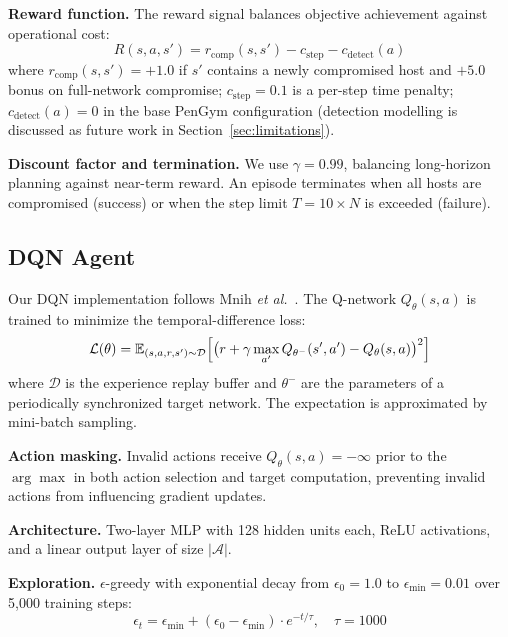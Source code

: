\documentclass[conference]{IEEEtran}
\begin{document}
\textbf{Reward function.}  The reward signal balances objective
achievement against operational cost:
\begin{equation}
  R(s, a, s') = r_{\text{comp}}(s,s') - c_{\text{step}} - c_{\text{detect}}(a)
  \label{eq:reward}
\end{equation}
where
$r_{\text{comp}}(s, s') = +1.0$ if $s'$ contains a newly compromised
host and $+5.0$ bonus on full-network compromise;
$c_{\text{step}} = 0.1$ is a per-step time penalty;
$c_{\text{detect}}(a) = 0$ in the base PenGym configuration (detection
modelling is discussed as future work in Section~\ref{sec:limitations}).

\textbf{Discount factor and termination.}  We use $\gamma = 0.99$,
balancing long-horizon planning against near-term reward.
An episode terminates when all hosts are compromised (success) or
when the step limit $T = 10 \times N$ is exceeded (failure).

\subsection{DQN Agent}
\label{sec:dqn}

Our DQN implementation follows Mnih \emph{et al.}~\cite{mnih2015nature}.
The Q-network $Q_\theta(s, a)$ is trained to minimize the temporal-difference
loss:
\begin{equation}
  \mathcal{L}(\theta) = \mathbb{E}_{(s,a,r,s') \sim \mathcal{D}}
  \Bigl[
    \bigl(r + \gamma \max_{a'} Q_{\theta^{-}}(s', a') - Q_\theta(s, a)\bigr)^2
  \Bigr]
  \label{eq:dqn_loss}
\end{equation}
where $\mathcal{D}$ is the experience replay buffer and $\theta^{-}$
are the parameters of a periodically synchronized target network.
The expectation is approximated by mini-batch sampling.

\textbf{Action masking.}  Invalid actions receive $Q_\theta(s, a) = -\infty$
prior to the $\arg\max$ in both action selection and target computation,
preventing invalid actions from influencing gradient updates.

\textbf{Architecture.}  Two-layer MLP with 128 hidden units each,
ReLU activations, and a linear output layer of size $|\mathcal{A}|$.

\textbf{Exploration.}  $\epsilon$-greedy with exponential decay from
$\epsilon_0 = 1.0$ to $\epsilon_{\min} = 0.01$ over 5,000 training steps:
\begin{equation}
  \epsilon_t = \epsilon_{\min} + (\epsilon_0 - \epsilon_{\min}) \cdot
  e^{-t / \tau}, \quad \tau = 1000
  \label{eq:epsdecay}
\end{equation}
\end{document}
